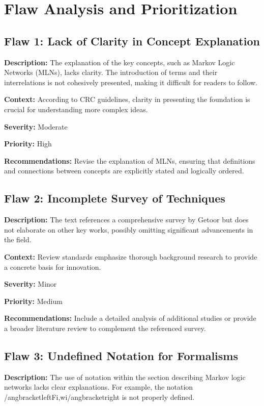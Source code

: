 \documentclass{article}
\begin{document}
\section*{Flaw Analysis and Prioritization}

\subsection*{Flaw 1: Lack of Clarity in Concept Explanation}
\textbf{Description:} The explanation of the key concepts, such as Markov Logic Networks (MLNs), lacks clarity. The introduction of terms and their interrelations is not cohesively presented, making it difficult for readers to follow.

\textbf{Context:} According to CRC guidelines, clarity in presenting the foundation is crucial for understanding more complex ideas.

\textbf{Severity:} Moderate

\textbf{Priority:} High

\textbf{Recommendations:} Revise the explanation of MLNs, ensuring that definitions and connections between concepts are explicitly stated and logically ordered.

\subsection*{Flaw 2: Incomplete Survey of Techniques}
\textbf{Description:} The text references a comprehensive survey by Getoor but does not elaborate on other key works, possibly omitting significant advancements in the field.

\textbf{Context:} Review standards emphasize thorough background research to provide a concrete basis for innovation.

\textbf{Severity:} Minor

\textbf{Priority:} Medium

\textbf{Recommendations:} Include a detailed analysis of additional studies or provide a broader literature review to complement the referenced survey.

\subsection*{Flaw 3: Undefined Notation for Formalisms}
\textbf{Description:} The use of notation within the section describing Markov logic networks lacks clear explanations. For example, the notation /angbracketleftFi,wi/angbracketright is not properly defined.
\end{document}
